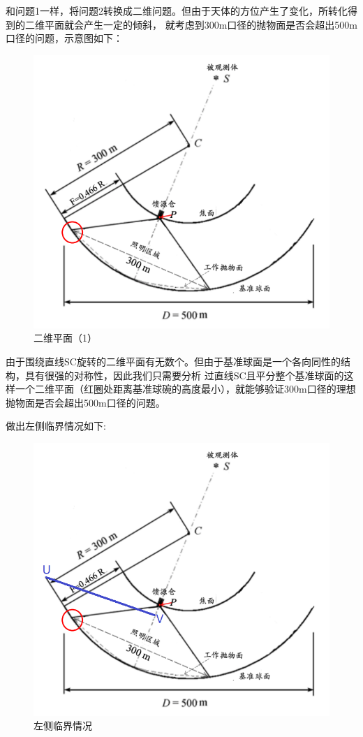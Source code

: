 \documentclass[withoutpreface,bwprint]{cumcmthesis} %
\begin{document}
和问题1一样，将问题2转换成二维问题。但由于天体的方位产生了变化，所转化得到的二维平面就会产生一定的倾斜，
就考虑到300m口径的抛物面是否会超出500m口径的问题，示意图如下：
\begin{figure}[H]
    \centering
    \includegraphics[scale=0.25]{images/pomian.png}
    \caption{二维平面（1）}
\end{figure}

由于围绕直线SC旋转的二维平面有无数个。但由于基准球面是一个各向同性的结构，具有很强的对称性，因此我们只需要分析
过直线SC且平分整个基准球面的这样一个二维平面（红圈处距离基准球碗的高度最小），就能够验证300m口径的理想抛物面是否会超出500m口径的问题。


做出左侧临界情况如下:

\begin{figure}[H]
    \centering
    \includegraphics[scale=0.50]{images/pomian3.png}
    \caption{左侧临界情况}
\end{figure}
\end{document}

